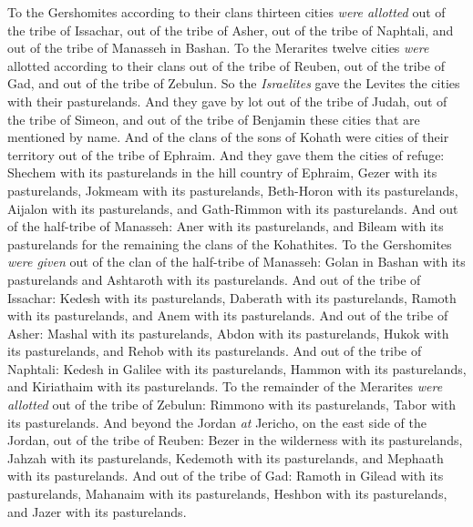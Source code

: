 \begin{biblechapter}
\verse To the Gershomites according to their clans thirteen cities \textit{were allotted} out of the tribe of Issachar, out of the tribe of Asher, out of the tribe of Naphtali, and out of the tribe of Manasseh in Bashan.
\verse To the Merarites twelve cities \textit{were} allotted according to their clans out of the tribe of Reuben, out of the tribe of Gad, and out of the tribe of Zebulun.
\verse So the \textit{Israelites} gave the Levites the cities with their pasturelands.
\verse And they gave by lot out of the tribe of Judah, out of the tribe of Simeon, and out of the tribe of Benjamin these cities that are mentioned by name.
\verse And of the clans of the sons of Kohath were cities of their territory out of the tribe of Ephraim.
\verse And they gave them the cities of refuge: Shechem with its pasturelands in the hill country of Ephraim, Gezer with its pasturelands,
\verse Jokmeam with its pasturelands, Beth-Horon with its pasturelands,
\verse Aijalon with its pasturelands, and Gath-Rimmon with its pasturelands.
\verse And out of the half-tribe of Manasseh: Aner with its pasturelands, and Bileam with its pasturelands for the remaining the clans of the Kohathites.
\verse To the Gershomites \textit{were given} out of the clan of the half-tribe of Manasseh: Golan in Bashan with its pasturelands and Ashtaroth with its pasturelands.
\verse And out of the tribe of Issachar: Kedesh with its pasturelands, Daberath with its pasturelands,
\verse Ramoth with its pasturelands, and Anem with its pasturelands.
\verse And out of the tribe of Asher: Mashal with its pasturelands, Abdon with its pasturelands,
\verse Hukok with its pasturelands, and Rehob with its pasturelands.
\verse And out of the tribe of Naphtali: Kedesh in Galilee with its pasturelands, Hammon with its pasturelands, and Kiriathaim with its pasturelands.
\verse To the remainder of the Merarites \textit{were allotted} out of the tribe of Zebulun: Rimmono with its pasturelands, Tabor with its pasturelands.
\verse And beyond the Jordan \textit{at} Jericho, on the east side of the Jordan, out of the tribe of Reuben: Bezer in the wilderness with its pasturelands, Jahzah with its pasturelands,
\verse Kedemoth with its pasturelands, and Mephaath with its pasturelands.
\verse And out of the tribe of Gad: Ramoth in Gilead with its pasturelands, Mahanaim with its pasturelands,
\verse Heshbon with its pasturelands, and Jazer with its pasturelands.
\end{biblechapter}

